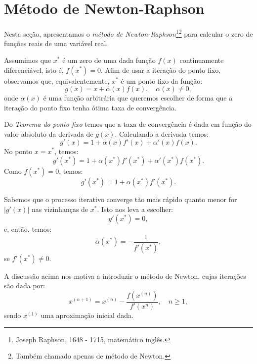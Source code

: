 \section{Método de Newton-Raphson}\label{metodo_newton_1d}

Nesta seção, apresentamos o \emph{método de Newton-Raphson}\footnote{Joseph Raphson, 1648 - 1715, matemático inglês.}\footnote{Também chamado apenas de método de Newton.} para calcular o zero de funções reais de uma variável real. 

Assumimos que $x^*$ é um zero de uma dada função $f(x)$ continuamente diferenciável, isto é, $f(x^*) = 0$. Afim de usar a iteração do ponto fixo, observamos que, equivalentemente, $x^*$ é um ponto fixo da função:
\begin{equation*}
  g(x)= x + \alpha(x)f(x),\quad\alpha(x)\neq 0,
\end{equation*}
onde $\alpha(x)$ é uma função arbitrária que queremos escolher de forma que a iteração do ponto fixo tenha ótima taxa de convergência. 

Do \emph{Teorema do ponto fixo} temos que a taxa de convergência é dada em função do valor absoluto da derivada de $g(x)$. Calculando a derivada temos:
\begin{equation*}
  g'(x)=1+\alpha(x)f'(x)+\alpha'(x)f(x).
\end{equation*}
No ponto $x = x^*$, temos:
\begin{equation*}
  g'(x^*) = 1 + \alpha(x^*)f'(x^*) + \alpha'(x^*)f(x^*).
\end{equation*}
Como $f(x^*)=0$, temos:
\begin{equation*}
  g'(x^*) = 1 + \alpha(x^*)f'(x^*).
\end{equation*}

Sabemos que o processo iterativo converge tão mais rápido quanto menor for $|g'(x)|$ nas vizinhanças de $x^*$. Isto nos leva a escolher:
\begin{equation*}
  g'(x^*) = 0,
\end{equation*}
e, então, temos:
\begin{equation*}
  \alpha(x^*) = -\frac{1}{f'(x^*)},
\end{equation*}
se $f'(x^*)\neq 0$.

A discussão acima nos motiva a introduzir o método de Newton, cujas iterações são dada por:
\begin{equation*}
  x^{(n+1)} = x^{(n)} - \frac{f\left(x^{(n)}\right)}{f'\left(x^{n}\right)}, \quad n\geq 1,
\end{equation*}
sendo $x^{(1)}$ uma aproximação inicial dada.

